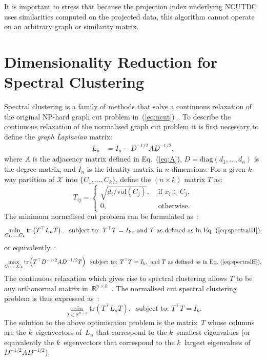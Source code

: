 \documentclass{book}
\def\R{\mathbb{R}}
\def\tr#1{\mathrm{tr}\left(#1\right)}
\begin{document}
\noindent
%
It is important to stress that because the projection index underlying NCUTDC
uses similarities computed on the projected data, this algorithm cannot operate
on an arbitrary graph or similarity matrix.




\section{Dimensionality Reduction for Spectral Clustering}

Spectral clustering is a family of methods that solve a continuous relaxation
of the original NP-hard graph cut problem in~(\ref{eq:ncut})~\cite{HagenK1992,ShiM2000,Luxburg2007}. 
%
To describe the continuous relaxation of the normalised graph cut problem it is first necessary to
define the \emph{graph Laplacian} matrix:
%
\begin{align*}
%
L_n &= I_n - D^{-1/2}AD^{-1/2},
%
\end{align*} 
where $A$ is the adjacency matrix defined in Eq.~(\ref{eq:A}),
$D = \textrm{diag}(d_1,\ldots,d_n)$ is the degree matrix, and $I_n$ is the identity matrix
in $n$ dimensions.
%
For a given $k$-way partition of $\mathcal{X}$ into $\{C_1,\ldots,C_k\}$, define the $(n \times k)$ matrix
$T$ as:
%
\begin{equation}\label{eq:spectralH}
%
T_{ij} = \left\{ \begin{array}{ll} \sqrt{d_i/ \mathrm{vol}(C_j)}, & \textrm{ if } x_i \in C_j, \\
	0, & \textrm{ otherwise}. \end{array} \right.
%
\end{equation}
The minimum normalised cut problem can be formulated as~\cite{ShiM2000}:
%
\[
%
\min_{C_1,\ldots,C_k} \tr{T^\top L_n T}, \; \textrm{ subject to: } T^\top T = I_k, 
	\textrm{ and } T \textrm{ as defined as in Eq.~(\ref{eq:spectralH})},
%
\]
%
or equivalently~\cite{NgJW2001}:
\[
%
\max_{C_1,\ldots,C_k} \tr{T^\top D^{-1/2} A D^{-1/2} T} \; \textrm{ subject to: } T^\top T = I_k,
	\textrm{ and } T \textrm{ as defined as in Eq.~(\ref{eq:spectralH})}.
%
\]
%
The continuous relaxation which gives rise to spectral clustering 
allows $T$ to
be any orthonormal matrix in~$\R^{n \times k}$~\cite{Luxburg2007}. 
The normalised cut spectral clustering problem is thus expressed as~\cite{ShiM2000}:
\[
\min_{T \in \R^{n \times k}} \tr{T^\top L_n T}, \; \textrm{ subject to: } T^\top T = I_k.
\]
The solution to the above optimisation problem is the matrix~$T$ whose columns 
are the $k$~eigenvectors of~$L_n$ that correspond to the $k$~smallest
eigenvalues (or equivalently the $k$~eigenvectors that correspond to the $k$~largest
eigenvalues of $D^{-1/2} A D^{-1/2}$).
\end{document}
